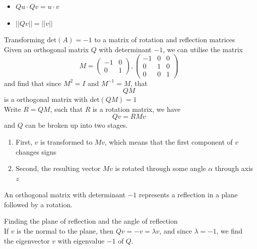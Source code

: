 \documentclass[journal, letterpaper]{IEEEtran}
\begin{document}
    \begin{itemize}
        \item $Qu \cdot Qv = u \cdot v$
        \item $||Qv|| = ||v||$
    \end{itemize}
    \begin{mybox}{Transforming $\text{det}(A) = -1$ to a matrix of rotation and reflection matrices} \\
        Given an orthogonal matrix $Q$ with determinant $-1$, we can utilise the matrix
        $$ M = \begin{pmatrix}
            -1 & 0 \\ 0 & 1
        \end{pmatrix}, \begin{pmatrix}
            -1 & 0 & 0 \\ 0 & 1 & 0 \\ 0 & 0 & 1
        \end{pmatrix}$$
        and find that since $M^2 = I$ and $M^{-1} = M$, that
        $$ QM$$
        is a orthogonal matrix with $\text{det}(QM) = 1$
        \newline \\ 
        Write $R = QM$, such that $R$ is a rotation matrix, we have
        $$ Qv = RMv$$
        and $Q$ can be broken up into two stages.
        \begin{enumerate}
            \item First, $v$ is transformed to $Mv$, which means that the first component of $v$ changes signs
            \item Second, the resulting vector $Mv$ is rotated through some angle $\alpha$ through axis $z$
        \end{enumerate}
        \begin{center}
            An orthogonal matrix with determinant $-1$ represents a reflection in a plane followed by a rotation.
        \end{center}
    \end{mybox}
    \begin{myboxr}{Finding the plane of reflection and the angle of reflection} \\
        If $v$ is the normal to the plane, then $Qv = -v = \lambda v$, and since $\lambda = -1$, we find the eigenvector $v$ with eigenvalue $-1$ of $Q$.
    \end{myboxr}
\end{document}
